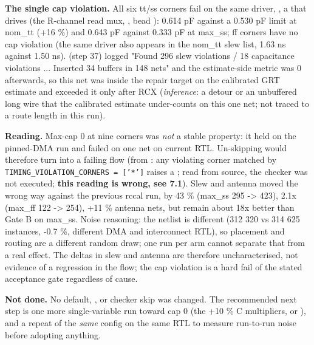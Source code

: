 \begin{record}
{}

\textbf{The single cap violation.} All six tt/ss corners fail on the
same driver, , a  that
drives  (the  R-channel
read mux,  , bead
): 0.614 pF against a 0.530 pF limit at nom\_tt (+16 \%) and
0.643 pF against 0.333 pF at max\_ss; ff corners have no cap violation
(the same driver also appears in the nom\_tt slew list, 1.63 ns against
1.50 ns).  (step 37) logged "Found 296 slew
violations / 18 capacitance violations ... Inserted 34 buffers in 148
nets" and the estimate-side  metric was 0 afterwards, so
this net was inside the repair target on the calibrated GRT estimate and
exceeded it only after RCX (\emph{inference}: a detour or an unbuffered
long wire that the calibrated estimate under-counts on this one net; not
traced to a route length in this run).

\textbf{Reading.} Max-cap 0 at nine corners was \emph{not} a stable
property: it held on the pinned-DMA run and failed on one net on current
RTL. Un-skipping would therefore turn  into a
failing flow (from 
: any violating corner
matched by
\texttt{TIMING\_\allowbreak{}VIOLATION\_\allowbreak{}CORNERS\ =\allowbreak{}\ ['*']}
raises a ; read from source, the checker was not
executed; \textbf{this reading is wrong, see 7.1}). Slew and antenna
moved the wrong way against the previous rccal run, by 43 \% (max\_ss
295 -\textgreater{} 423), 2.1x (max\_ff 122 -\textgreater{} 254), +11 \%
antenna nets, but remain about 18x better than Gate B on max\_ss. Noise
reasoning: the netlist is different (312 320 vs 314 625 instances, -0.7
\%, different DMA and interconnect RTL), so placement and routing are a
different random draw; one run per arm cannot separate that from a real
effect. The deltas in slew and antenna are therefore uncharacterised,
not evidence of a regression in the flow; the cap violation is a hard
fail of the stated acceptance gate regardless of cause.

\textbf{Not done.} No default, ,  or
checker skip was changed. The recommended next step is one more
single-variable run toward cap 0 (the +10 \% C multipliers, or
), and a repeat of the
\emph{same} config on the same RTL to measure run-to-run noise before
adopting anything.

\end{record}

